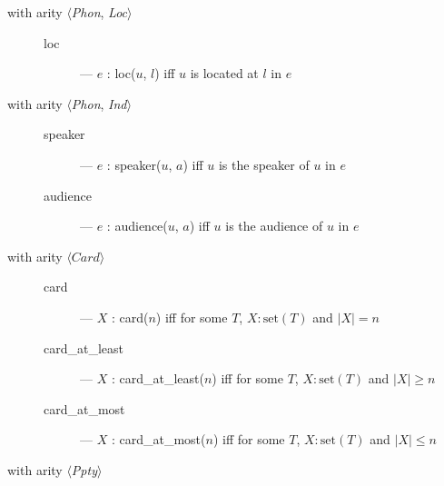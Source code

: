 \begin{description}

 \item[with arity \textnormal{$\langle$\textit{Phon},
    \textit{Loc}$\rangle$}] \mbox{}
  
    \begin{description}

    \item[\textnormal{loc}] --- $e$ : loc($u$, $l$) iff $u$ is located
      at $l$ in $e$

    \end{description}
    
  \item[with arity \textnormal{$\langle$\textit{Phon},
      \textit{Ind}$\rangle$}] \mbox{}

    \begin{description}

    \item[\textnormal{speaker}] --- $e$ : speaker($u$, $a$) iff $u$
        is the speaker of $u$ in $e$

    \item[\textnormal{audience}] --- $e$ : audience($u$, $a$) iff
        $u$ is the audience of $u$ in $e$

      \end{description}

    \item[with arity \textnormal{$\langle\textit{Card}\rangle$}] \mbox{}

  \begin{description}
    
  \item[\textnormal{card}] --- $X$ : card($n$) iff for some $T$,
    $X:\mathrm{set}(T)$ and $|X|=n$
    
  \item[\textnormal{card\_at\_least}] --- $X$ : card\_at\_least($n$) iff for some $T$, $X:\mathrm{set}(T)$
    and $|X|\geq n$

    
  \item[\textnormal{card\_at\_most}] --- $X$ : card\_at\_most($n$) iff for some $T$, $X:\mathrm{set}(T)$
    and $|X|\leq n$

  \end{description}
      
  \item[with arity \textnormal{$\langle$\textit{Ppty}$\rangle$}]
    \mbox{}

    \begin{description}
      

\end{description}
\end{description}
